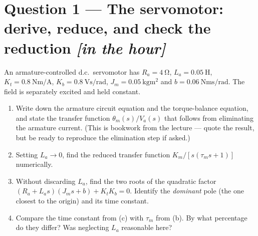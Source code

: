 \documentclass[11pt,a4paper]{article}
\newcommand{\inhour}{\hfill{\small\color{faccent}\itshape[in the hour]}}
\begin{document}
\section*{Question 1 --- The servomotor: derive, reduce, and check the
reduction \inhour}

An armature-controlled d.c.\ servomotor has $R_a=\SI{4}{\ohm}$,
$L_a=\SI{0.05}{\henry}$, $K_t=\SI{0.8}{\newton\metre\per\ampere}$,
$K_b=\SI{0.8}{\volt\second\per\radian}$,
$J_m=\SI{0.05}{\kilogram\metre\squared}$ and
$b=\SI{0.06}{\newton\metre\second\per\radian}$. The field is separately
excited and held constant.

\begin{enumerate}[label=(\alph*)]
\item Write down the armature circuit equation and the torque-balance
      equation, and state the transfer function $\theta_m(s)/V_a(s)$ that
      follows from eliminating the armature current. (This is bookwork from
      the lecture --- quote the result, but be ready to reproduce the
      elimination step if asked.)

\item Setting $L_a\to0$, find the reduced transfer function
      $K_m/[s(\tau_ms+1)]$ numerically.

\item Without discarding $L_a$, find the two roots of the quadratic factor
      $(R_a+L_as)(J_ms+b)+K_tK_b=0$. Identify the \emph{dominant} pole (the
      one closest to the origin) and its time constant.

\item Compare the time constant from (c) with $\tau_m$ from (b). By what
      percentage do they differ? Was neglecting $L_a$ reasonable here?
\end{enumerate}
\end{document}
